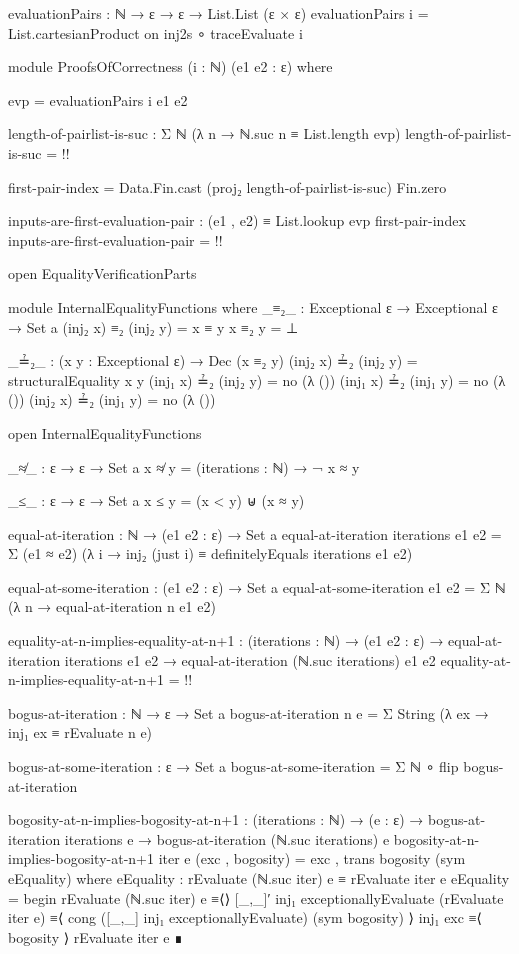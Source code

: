 \documentclass{report}
\begin{document}
\begin{code}
    evaluationPairs : ℕ → ε → ε → List.List (ε × ε)
    evaluationPairs i = List.cartesianProduct on inj2s ∘ traceEvaluate i

    module ProofsOfCorrectness
      (i : ℕ)
      (e1 e2 : ε) where

      evp = evaluationPairs i e1 e2

      length-of-pairlist-is-suc : Σ ℕ (λ n → ℕ.suc n ≡ List.length evp)
      length-of-pairlist-is-suc = {!!}

      first-pair-index = Data.Fin.cast (proj₂ length-of-pairlist-is-suc) Fin.zero

      inputs-are-first-evaluation-pair :
        (e1 , e2) ≡ List.lookup evp first-pair-index
      inputs-are-first-evaluation-pair = {!!}

  open EqualityVerificationParts

  module InternalEqualityFunctions where
    _≡₂_ : Exceptional ε → Exceptional ε → Set a
    (inj₂ x) ≡₂ (inj₂ y) = x ≡ y
    x ≡₂ y = ⊥

    _≟₂_ : (x y : Exceptional ε) → Dec (x ≡₂ y)
    (inj₂ x) ≟₂ (inj₂ y) = structuralEquality x y
    (inj₁ x) ≟₂ (inj₂ y) = no (λ ())
    (inj₁ x) ≟₂ (inj₁ y) = no (λ ())
    (inj₂ x) ≟₂ (inj₁ y) = no (λ ())

  open InternalEqualityFunctions

  _≉_ : ε → ε → Set a
  x ≉ y = (iterations : ℕ) → ¬ x ≈ y

  _≤_ : ε → ε → Set a
  x ≤ y = (x < y) ⊎ (x ≈ y)

  equal-at-iteration : ℕ → (e1 e2 : ε) → Set a
  equal-at-iteration iterations e1 e2 =
    Σ (e1 ≈ e2)
      (λ i → inj₂ (just i) ≡ definitelyEquals iterations e1 e2)

  equal-at-some-iteration : (e1 e2 : ε) → Set a
  equal-at-some-iteration e1 e2 = Σ ℕ (λ n → equal-at-iteration n e1 e2)

  equality-at-n-implies-equality-at-n+1 :
    (iterations : ℕ) →
    (e1 e2 : ε) →
    equal-at-iteration iterations e1 e2 →
    equal-at-iteration (ℕ.suc iterations) e1 e2
  equality-at-n-implies-equality-at-n+1 = {!!}

  bogus-at-iteration : ℕ → ε → Set a
  bogus-at-iteration n e = Σ String (λ ex → inj₁ ex ≡ rEvaluate n e)

  bogus-at-some-iteration : ε → Set a
  bogus-at-some-iteration = Σ ℕ ∘ flip bogus-at-iteration

  bogosity-at-n-implies-bogosity-at-n+1 :
    (iterations : ℕ) →
    (e : ε) →
    bogus-at-iteration iterations e →
    bogus-at-iteration (ℕ.suc iterations) e
  bogosity-at-n-implies-bogosity-at-n+1 iter e (exc , bogosity) =
    exc , trans bogosity (sym eEquality)
    where
    eEquality : rEvaluate (ℕ.suc iter) e ≡ rEvaluate iter e
    eEquality = begin
      rEvaluate (ℕ.suc iter) e
        ≡⟨⟩
      [_,_]′ inj₁ exceptionallyEvaluate (rEvaluate iter e)
        ≡⟨ cong ([_,_] inj₁ exceptionallyEvaluate) (sym bogosity) ⟩
      inj₁ exc
        ≡⟨ bogosity ⟩
      rEvaluate iter e ∎


\end{code}
\end{document}
